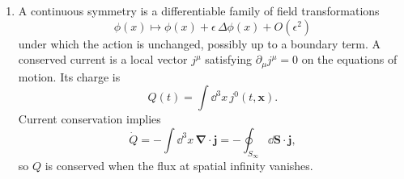 
\begin{enumerate}
\begin{enumerate}
\item
A continuous symmetry is a differentiable family of field
transformations
\[
 \phi(x)\longmapsto\phi(x)+\epsilon\,\Delta\phi(x)+O(\epsilon^2)
\]
under which the action is unchanged, possibly up to a boundary term.
A conserved current is a local vector \(j^\mu\) satisfying
\(\partial_\mu j^\mu=0\) on the equations of motion.  Its charge is
\[
 Q(t)=\int \dd^3x\,j^0(t,\mathbf x).
\]
Current conservation implies
\[
 \dot Q=-\int \dd^3x\,\boldsymbol\nabla\cdot\mathbf j
       =-\oint_{S_\infty}\dd\mathbf S\cdot\mathbf j,
\]
so \(Q\) is conserved when the flux at spatial infinity vanishes.


\end{enumerate}
\end{enumerate}
